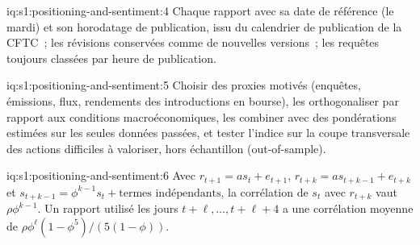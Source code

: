 \begin{solution}{iq:s1:positioning-and-sentiment:4}
Chaque rapport avec sa date de référence (le mardi) et son horodatage de publication, issu du calendrier de publication de la CFTC~; les révisions conservées comme de nouvelles versions~; les requêtes
toujours classées par heure de publication.
\end{solution}

\begin{solution}{iq:s1:positioning-and-sentiment:5}
Choisir des proxies motivés (enquêtes, émissions, flux, rendements des introductions en bourse), les orthogonaliser par rapport aux conditions macroéconomiques, les combiner avec des pondérations
estimées sur les seules données passées, et tester l'indice sur la coupe transversale des actions difficiles à valoriser, hors échantillon (out-of-sample).
\end{solution}

\begin{solution}{iq:s1:positioning-and-sentiment:6}
Avec $r_{t+1} = a s_t + e_{t+1}$, $r_{t+k} = a s_{t+k-1} + e_{t+k}$ et $s_{t+k-1} = \phi^{k-1}s_t + \text{termes indépendants}$, la corrélation de $s_t$
avec $r_{t+k}$ vaut $\rho\phi^{k-1}$. Un rapport utilisé les jours $t + \ell, \dots, t + \ell + 4$ a une corrélation moyenne de $\rho\phi^{\ell}(1 - \phi^5)/(5(1 - \phi))$.
\end{solution}

